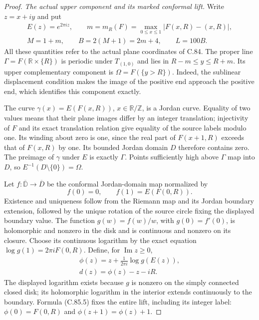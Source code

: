\begin{proof}
\emph{The actual upper component and its marked conformal lift.}
Write $z=x+iy$ and put
\[
 \begin{gathered}
 E(z)=e^{2\pi iz},\qquad
 m=m_R(F)=\max_{0\leq x\leq1}|F(x,R)-(x,R)|,\\
 M=1+m,\qquad B=2(M+1)=2m+4,\qquad L=100B.
 \end{gathered}                                                   \tag{C.85.3}
\]
All these quantities refer to the actual
plane coordinates of C.84.
The proper line $\Gamma=F(\mathbb R\times\{R\})$
is periodic under $T_{(1,0)}$ and lies in
$R-m\leq y\leq R+m$.
Its upper complementary component is
$\Omega=F(\{y>R\})$. Indeed, the sublinear
displacement condition makes the image of
the positive end approach the positive end,
which identifies this component exactly.

The curve
$\gamma(x)=E(F(x,R))$, $x\in\mathbb R/\mathbb Z$,
is a Jordan curve. Equality of two values
means that their plane images differ by an
integer translation; injectivity of $F$
and its exact translation relation give
equality of the source labels modulo one.
Its winding about zero is one, since the
real part of $F(x+1,R)$ exceeds that of
$F(x,R)$ by one. Its bounded Jordan domain
$D$ therefore contains zero.
The preimage of $\gamma$ under $E$ is
exactly $\Gamma$. Points sufficiently high
above $\Gamma$ map into $D$, so
$E^{-1}(D\setminus\{0\})=\Omega$.

Let $f:\overline{\mathbb D}\to\overline D$
be the conformal Jordan-domain map normalized
by
\[
                  f(0)=0,\qquad f(1)=E(F(0,R)).                  \tag{C.85.4}
\]
Existence and uniqueness follow from the
Riemann map and its Jordan boundary
extension, followed by the unique rotation
of the source circle fixing the displayed
boundary value. The function
$g(w)=f(w)/w$, with $g(0)=f'(0)$,
is holomorphic and nonzero in the disk
and is continuous and nonzero on its
closure. Choose its continuous logarithm
by the exact equation
$\log g(1)=2\pi iF(0,R)$.
Define, for $\operatorname{Im}z\geq0$,
\[
 \begin{gathered}
 \phi(z)=z+\frac{1}{2\pi i}\log g(E(z)),\\
 d(z)=\phi(z)-z-iR.
 \end{gathered}                                                   \tag{C.85.5}
\]
The displayed logarithm exists because
$g$ is nonzero on the simply connected
closed disk; its holomorphic logarithm
in the interior extends continuously
to the boundary. Formula (C.85.5) fixes
the entire lift, including its integer
label: $\phi(0)=F(0,R)$ and
$\phi(z+1)=\phi(z)+1$.


\end{proof}
